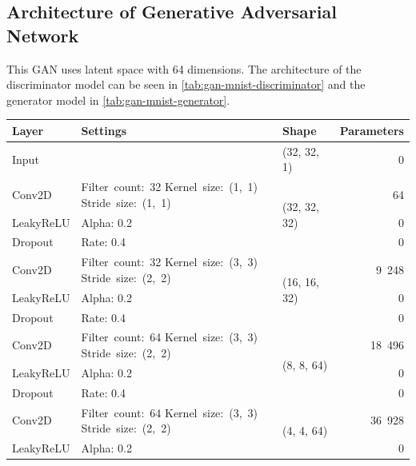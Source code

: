 \subsection*{Architecture of Generative Adversarial Network}
This GAN uses latent space with 64 dimensions. The architecture of the discriminator model can be seen in \autoref{tab:gan-mnist-discriminator} and the generator model in \autoref{tab:gan-mnist-generator}.

\begin{table}
    \begin{center}
        \begin{tabular}{ |m{5em}|m{9em}|l|r| }
            \hline
                Layer & Settings & Shape & \multicolumn{1}{l|}{Parameters} \\ 
            \hline
            \hline
                Input & & (32, 32, 1) & 0 \\
            \hline
                Conv2D & \mbox{Filter count: 32} \mbox{Kernel size: (1, 1)} \mbox{Stride size: (1, 1)} & \multirow{3}{6em}{(32, 32, 32)} & 64 \\
            \cline{1-2} \cline{4-4}
                LeakyReLU & Alpha: 0.2 & & 0 \\
            \cline{1-2} \cline{4-4}
                Dropout & Rate: 0.4 & & 0 \\
            \hline
                Conv2D & \mbox{Filter count: 32} \mbox{Kernel size: (3, 3)} \mbox{Stride size: (2, 2)} & \multirow{3}{6em}{(16, 16, 32)} & 9~248 \\
            \cline{1-2} \cline{4-4}
                LeakyReLU & Alpha: 0.2 & & 0 \\
            \cline{1-2} \cline{4-4}
                Dropout & Rate: 0.4 & & 0 \\
            \hline
                Conv2D & \mbox{Filter count: 64} \mbox{Kernel size: (3, 3)} \mbox{Stride size: (2, 2)} & \multirow{3}{6em}{(8, 8, 64)} & 18~496 \\
            \cline{1-2} \cline{4-4}
                LeakyReLU & Alpha: 0.2 & & 0 \\
            \cline{1-2} \cline{4-4}
                Dropout & Rate: 0.4 & & 0 \\
            \hline
                Conv2D & \mbox{Filter count: 64} \mbox{Kernel size: (3, 3)} \mbox{Stride size: (2, 2)} & \multirow{3}{6em}{(4, 4, 64)} & 36~928 \\
            \cline{1-2} \cline{4-4}
                LeakyReLU & Alpha: 0.2 & & 0 \\

\end{tabular}
\end{center}
\end{table}
